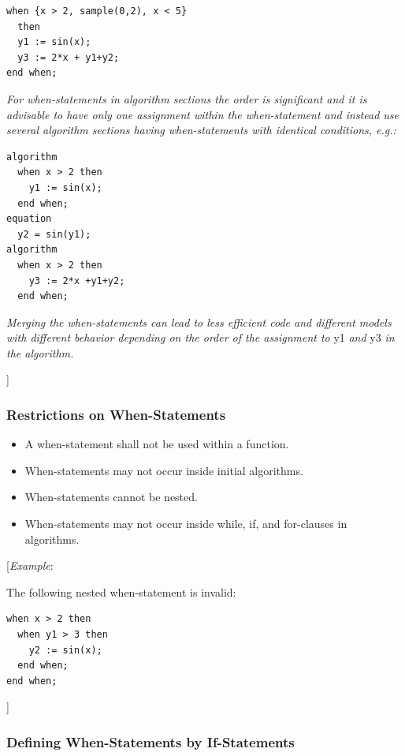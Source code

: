 \documentclass[10pt,a4paper]{report}
\def\doublelabel#1{\label{#1}}
\begin{document}
\begin{lstlisting}[language=modelica]
when {x > 2, sample(0,2), x < 5}
  then
  y1 := sin(x);
  y3 := 2*x + y1+y2;
end when;
\end{lstlisting}
\emph{For when-statements in algorithm sections the order is significant
and it is advisable to have only one assignment within the
when-statement and instead use several algorithm sections having
when-statements with identical conditions, e.g.:}

\begin{lstlisting}[language=modelica]
algorithm
  when x > 2 then
    y1 := sin(x);
  end when;
equation
  y2 = sin(y1);
algorithm
  when x > 2 then
    y3 := 2*x +y1+y2;
  end when;
\end{lstlisting}
\emph{Merging the when-statements can lead to less efficient code and
different models with different behavior depending on the order of the
assignment to} y1 \emph{and} y3 \emph{in the algorithm.}

{]}

\subsubsection{Restrictions on When-Statements}\doublelabel{restrictions-on-when-statements}

\begin{itemize}
\item
  A when-statement shall not be used within a function.
\item
  When-statements may not occur inside initial algorithms.
\item
  When-statements cannot be nested.
\item
  When-statements may not occur inside while, if, and for-clauses in
  algorithms.
\end{itemize}

{[}\emph{Example}:

The following nested when-statement is invalid:

\begin{lstlisting}[language=modelica]
when x > 2 then
  when y1 > 3 then
    y2 := sin(x);
  end when;
end when;
\end{lstlisting}
{]}

\subsubsection{Defining When-Statements by If-Statements}\doublelabel{defining-when-statements-by-if-statements}
\end{document}
